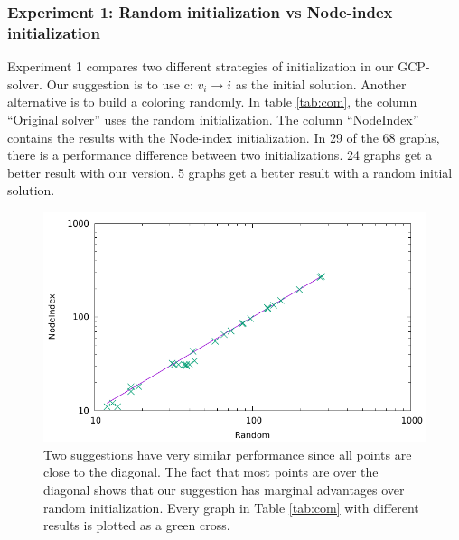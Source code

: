 \documentclass[12pt,a4paper,twoside]{scrartcl}
\numberwithin{equation}{section}
\begin{document}
\subsubsection{Experiment 1: Random initialization vs Node-index initialization}
\label{sec:Experiment 1}
Experiment 1 compares two different strategies of initialization in our GCP-solver. Our suggestion is to use c: $v_i \rightarrow i$ as the initial solution. 
Another alternative is to build a coloring randomly. In table \ref{tab:com}, the column ``Original solver'' uses the random initialization. The column ``NodeIndex'' contains the results with the Node-index initialization. In 29 of the 68 graphs, there is a performance difference between two initializations. 24 graphs get a better result with our version. 5 graphs get a better result with a random initial solution.
\begin{figure}[h!]
\begin{center}
  \includegraphics[scale = 1]{Experiments/E1/scalog.pdf}
  \end{center}
  \caption{Two suggestions have very similar performance since all points are close to the diagonal. The fact that most points are over the diagonal shows that our suggestion has marginal advantages over random initialization. Every graph in Table \ref{tab:com} with different results  is plotted as a green cross.}
  \label{Experiment 1 scatter plot}
  \end{figure}
  
\end{document}
